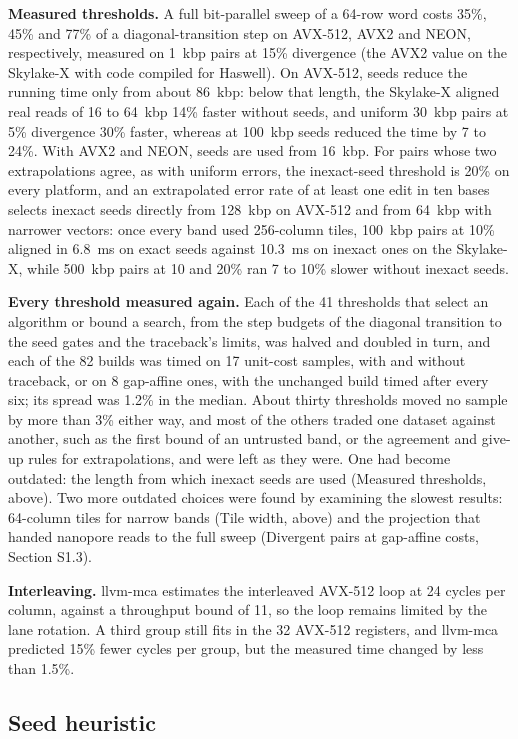 \documentclass[10pt]{article}
\begin{document}
\textbf{Measured thresholds.} A full bit-parallel sweep of a 64-row word costs 35\%, 45\% and 77\% of a diagonal-transition step on AVX-512, AVX2 and NEON, respectively, measured on 1~kbp pairs at 15\% divergence (the AVX2 value on the Skylake-X with code compiled for Haswell). On AVX-512, seeds reduce the running time only from about 86~kbp: below that length, the Skylake-X aligned real reads of 16 to 64~kbp 14\% faster without seeds, and uniform 30~kbp pairs at 5\% divergence 30\% faster, whereas at 100~kbp seeds reduced the time by 7 to 24\%. With AVX2 and NEON, seeds are used from 16~kbp. For pairs whose two extrapolations agree, as with uniform errors, the inexact-seed threshold is 20\% on every platform, and an extrapolated error rate of at least one edit in ten bases selects inexact seeds directly from 128~kbp on AVX-512 and from 64~kbp with narrower vectors: once every band used 256-column tiles, 100~kbp pairs at 10\% aligned in 6.8~ms on exact seeds against 10.3~ms on inexact ones on the Skylake-X, while 500~kbp pairs at 10 and 20\% ran 7 to 10\% slower without inexact seeds.

\textbf{Every threshold measured again.} Each of the 41 thresholds that select an algorithm or bound a search, from the step budgets of the diagonal transition to the seed gates and the traceback's limits, was halved and doubled in turn, and each of the 82 builds was timed on 17 unit-cost samples, with and without traceback, or on 8 gap-affine ones, with the unchanged build timed after every six; its spread was 1.2\% in the median. About thirty thresholds moved no sample by more than 3\% either way, and most of the others traded one dataset against another, such as the first bound of an untrusted band, or the agreement and give-up rules for extrapolations, and were left as they were. One had become outdated: the length from which inexact seeds are used (Measured thresholds, above). Two more outdated choices were found by examining the slowest results: 64-column tiles for narrow bands (Tile width, above) and the projection that handed nanopore reads to the full sweep (Divergent pairs at gap-affine costs, Section S1.3).

\textbf{Interleaving.} llvm-mca estimates the interleaved AVX-512 loop at 24 cycles per column, against a throughput bound of 11, so the loop remains limited by the lane rotation. A third group still fits in the 32 AVX-512 registers, and llvm-mca predicted 15\% fewer cycles per group, but the measured time changed by less than 1.5\%.

\subsection{Seed heuristic}
\end{document}
